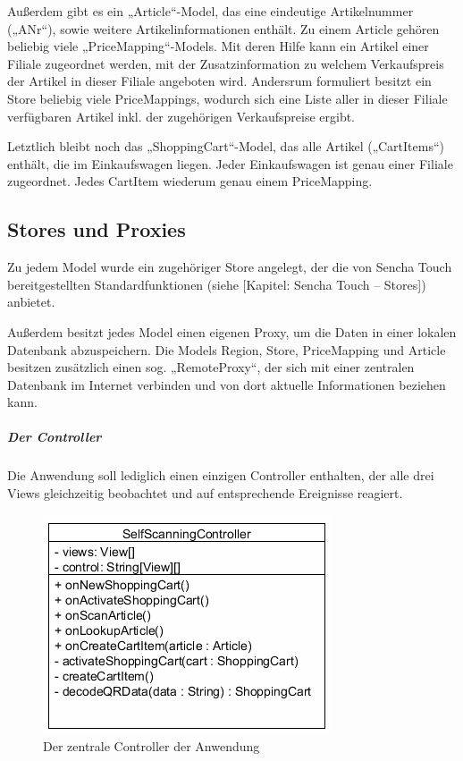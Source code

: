 Außerdem gibt es ein „Article“-Model, das eine eindeutige Artikelnummer („ANr“), sowie weitere Artikelinformationen enthält. Zu einem Article gehören beliebig viele „PriceMapping“-Models. Mit deren Hilfe kann ein Artikel einer Filiale zugeordnet werden, mit der Zusatzinformation zu welchem Verkaufspreis der Artikel in dieser Filiale angeboten wird. Andersrum formuliert besitzt ein Store beliebig viele PriceMappings, wodurch sich eine Liste aller in dieser Filiale verfügbaren Artikel inkl. der zugehörigen Verkaufspreise ergibt.

Letztlich bleibt noch das „ShoppingCart“-Model, das alle Artikel („CartItems“) enthält, die im Einkaufswagen liegen. Jeder Einkaufswagen ist genau einer Filiale zugeordnet. Jedes CartItem wiederum genau einem PriceMapping.

\subsection{Stores und Proxies}
Zu jedem Model wurde ein zugehöriger Store angelegt, der die von Sencha Touch bereitgestellten Standardfunktionen (siehe [Kapitel: Sencha Touch – Stores]) anbietet. 

Außerdem besitzt jedes Model einen eigenen Proxy, um die Daten in einer lokalen Datenbank abzuspeichern. Die Models Region, Store, PriceMapping und Article besitzen zusätzlich einen sog. „RemoteProxy“, der sich mit einer zentralen Datenbank im Internet verbinden und von dort aktuelle Informationen beziehen kann.

\subparagraph{Der Controller}
Die Anwendung soll lediglich einen einzigen Controller enthalten, der alle drei Views gleichzeitig beobachtet und auf entsprechende Ereignisse reagiert.

\begin{figure}[H]
\includegraphics[scale=1]{res/controller.png}
\caption{Der zentrale Controller der Anwendung}
\end{figure}

